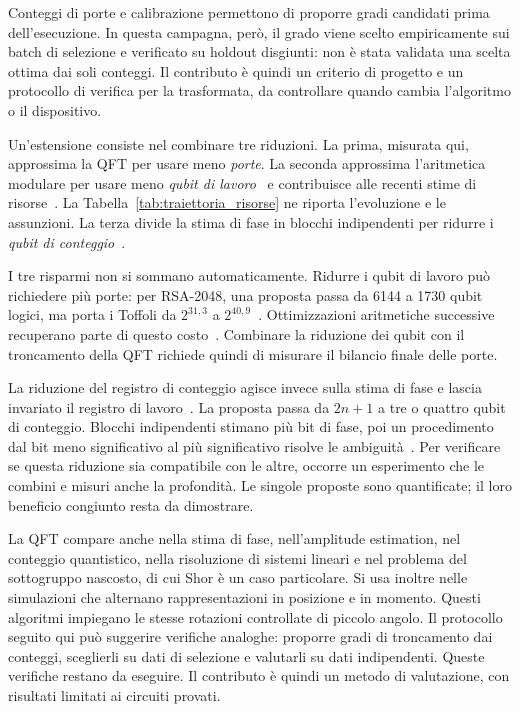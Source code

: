\begin{onehalfspace}
Conteggi di porte e calibrazione permettono di proporre gradi candidati
prima dell'esecuzione. In questa campagna, però, il grado viene scelto
empiricamente sui batch di selezione e verificato su holdout disgiunti:
non è stata validata una scelta ottima dai soli conteggi. Il contributo
è quindi un criterio di progetto e un protocollo di verifica per la
trasformata, da controllare quando cambia l'algoritmo o il dispositivo.

Un'estensione consiste nel combinare tre riduzioni. La prima, misurata qui, approssima la QFT per usare meno \emph{porte}. La seconda approssima l'aritmetica modulare per usare meno \emph{qubit di lavoro}~\cite{chevignard2025} e contribuisce alle recenti stime di risorse~\cite{gidney2025}. La Tabella~\ref{tab:traiettoria_risorse} ne riporta l'evoluzione e le assunzioni. La terza divide la stima di fase in blocchi indipendenti per ridurre i \emph{qubit di conteggio}~\cite{shukla2026}.

I tre risparmi non si sommano automaticamente. Ridurre i qubit di lavoro può richiedere più porte: per RSA-2048, una proposta passa da 6144 a 1730 qubit logici, ma porta i Toffoli da $2^{31{,}3}$ a $2^{40{,}9}$~\cite{chevignard2025}. Ottimizzazioni aritmetiche successive recuperano parte di questo costo~\cite{gidney2025}. Combinare la riduzione dei qubit con il troncamento della QFT richiede quindi di misurare il bilancio finale delle porte.

La riduzione del registro di conteggio agisce invece sulla stima di fase e lascia invariato il registro di lavoro~\cite{shukla2026}. La proposta passa da $2n+1$ a tre o quattro qubit di conteggio. Blocchi indipendenti stimano più bit di fase, poi un procedimento dal bit meno significativo al più significativo risolve le ambiguità~\cite{shuklaqpe2026}. Per verificare se questa riduzione sia compatibile con le altre, occorre un esperimento che le combini e misuri anche la profondità. Le singole proposte sono quantificate; il loro beneficio congiunto resta da dimostrare.

La QFT compare anche nella stima di fase, nell'amplitude estimation, nel conteggio quantistico, nella risoluzione di sistemi lineari e nel problema del sottogruppo nascosto, di cui Shor è un caso particolare. Si usa inoltre nelle simulazioni che alternano rappresentazioni in posizione e in momento. Questi algoritmi impiegano le stesse rotazioni controllate di piccolo angolo. Il protocollo seguito qui può suggerire verifiche analoghe: proporre gradi di troncamento dai conteggi, sceglierli su dati di selezione e valutarli su dati indipendenti. Queste verifiche restano da eseguire. Il contributo è quindi un metodo di valutazione, con risultati limitati ai circuiti provati.


\end{onehalfspace}
